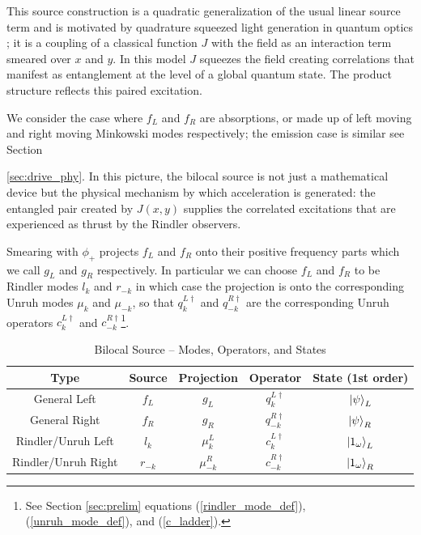 \documentclass[12pt,a4paper]{article}
\begin{document}
This source construction is a quadratic generalization of the usual linear source term \cite{Schwinger_1966} \cite{ryder1996quantum} and is motivated by quadrature squeezed light generation in quantum optics \cite{gerry2023introductory}; it is a coupling of a classical function $J$ with the field as an interaction term smeared over $x$ and $y$. In this model $J$ squeezes the field creating correlations that manifest as entanglement at the level of a global quantum state. The product structure reflects this paired excitation.

We consider the case where $f_L$ and $f_R$ are absorptions, or made up of left moving and right moving Minkowski modes respectively; the emission case is similar see Section {\ref{sec:drive_phy}. In this picture, the bilocal source is not just a mathematical device but the physical mechanism by which acceleration is generated: the entangled pair created by $J(x,y)$ supplies the correlated excitations that are experienced as thrust by the Rindler observers.


Smearing with $\phi_+$ projects $f_L$ and $f_R$ onto their positive frequency parts which we call $g_L$ and $g_R$ respectively. In particular we can choose $f_L$ and $f_R$ to be Rindler modes $l_k$ and $r_{-k}$ in which case the projection is onto the corresponding Unruh modes $\mu_k$ and $\mu_{-k}$, so that $q_{k}^{L\dagger}$ and $q_{-k}^{R\dagger}$ are the corresponding Unruh operators $c_{k}^{L\dagger}$ and $c_{-k}^{R\dagger}$\footnote{See Section \ref{sec:prelim} equations (\ref{rindler_mode_def}), (\ref{unruh_mode_def}), and (\ref{c_ladder}).}.  

\begin{table}[ht]
\caption{Bilocal Source -- Modes, Operators, and States}
\centering
\begin{tabular}{c c c c c} %
\hline\hline
Type & Source & Projection & Operator & State (1st order)\\ [0.5ex] %
\hline %
General Left & $f_L$ & $g_L$ & $q_{k}^{L\dagger}$ & $\ket{\psi}_{L}$\\
General Right & $f_R$ & $g_R$ & $q_{-k}^{R\dagger}$  & $\ket{\psi}_{R}$\\
Rindler/Unruh Left & $l_{k}$ & $\mu_{k}^L$ & $c_{k}^{L\dagger}$ & $\ket{1_\omega}_{L}$\\
Rindler/Unruh Right & $r_{-k}$ & $\mu_{-k}^R$ & $c_{-k}^{R\dagger}$ & $\ket{1_\omega}_{R}$\\
\hline %
\end{tabular}
\label{table:modes}
\end{table}

}
\end{document}
